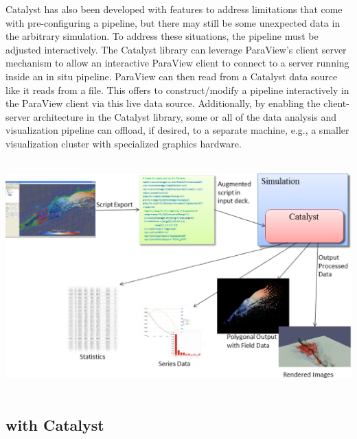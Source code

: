 Catalyst has also been developed with features to address limitations that come with pre-configuring a pipeline, but there may still be some unexpected data in the arbitrary simulation. To address these situations, the pipeline must be adjusted interactively.
The Catalyst library can leverage ParaView's client server mechanism to allow an interactive ParaView client to connect to a server running inside an in situ pipeline. ParaView can then read from a Catalyst data source like it reads from a file. This offers to construct/modify a pipeline interactively in the ParaView client via this live data source. Additionally, by enabling the client-server architecture in the Catalyst library, some or all of the data analysis and visualization pipeline can offload, if desired, to a separate machine, e.g., a smaller visualization cluster with specialized graphics hardware.

~\
\includegraphics[scale=0.47]{pictures/CatalystFullWorkFlow.eps}
\label{fig:catalyst}
\vspace{+0.04in}
~\

\subsection{\CS with Catalyst}

